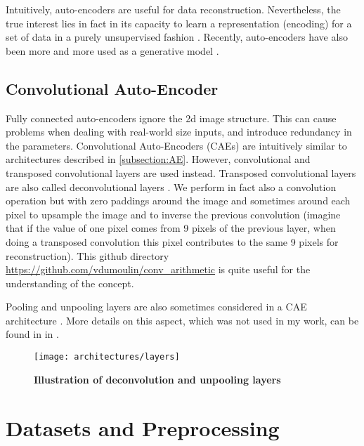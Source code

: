 Intuitively, auto-encoders are useful for data reconstruction.
Nevertheless, the true interest lies in fact in its capacity to learn
a representation (encoding) for a set of data in a purely unsupervised
fashion \cite{P. Vincent 2010}. Recently, auto-encoders have also
been more and more used as a generative model \cite{Y. Bengio 2013}.

\subsection{Convolutional Auto-Encoder}

Fully connected auto-encoders ignore the 2d image structure.
This can cause problems when dealing with real-world size inputs,
and introduce redundancy in the parameters.
Convolutional Auto-Encoders \cite{J. Masci 2011, V. Turchenko 2017}
(CAEs) are intuitively similar
to architectures described in \ref{subsection:AE}.
However, convolutional and transposed convolutional layers are used instead.
Transposed convolutional layers are also called deconvolutional
layers \cite{M. D. Zeiler 2011}.
We perform in fact also a convolution operation but with zero paddings
around the image and sometimes around each pixel to upsample the
image and to inverse the previous convolution
(imagine that if the value of one pixel comes from 9 pixels of the
previous layer, when doing a transposed convolution this pixel
contributes to the same 9 pixels for reconstruction).
This github directory
\href{https://github.com/vdumoulin/conv_arithmetic}
{https://github.com/vdumoulin/conv\_arithmetic}
is quite useful for the understanding of the concept.

Pooling and unpooling layers are also sometimes considered in a CAE
architecture \cite{V. Turchenko 2017}.
More details on this aspect, which was not used in my work, can be found in
in \cite{H. Noh 2015, V. Turchenko 2017}.

\vspace{-1em}
\begin{figure}[H]
  \centering
  \texttt{[image: architectures/layers]}
  \caption{%
    \textbf{Illustration of deconvolution and unpooling layers
      \cite{H. Noh 2015}}}
  \label{fig:layers}
\end{figure}

\section{Datasets and Preprocessing} \label{section:dataset}

